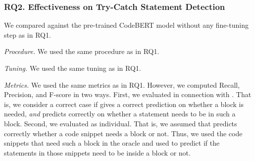 \subsubsection{RQ2. Effectiveness on Try-Catch Statement Detection\\}

 We compared {\xstate} against the pre-trained
CodeBERT model without any fine-tuning step as in RQ1.

{\em Procedure.} We used the same procedure as in RQ1.

{\em Tuning.} We used the same tuning as in RQ1.

{\em Metrics.} We used the same metrics as in RQ1. However, we
computed Recall, Precision, and F-score in two ways. First, we
evaluated {\xstate} in connection with {\xblock}. That is, we consider
a correct case if {\xblock} gives a correct prediction on whether a
 block is needed, {\em and} {\xstate} predicts
correctly on whether a statement needs to be in such a block. Second,
we evaluated {\xstate} as individual. That is, we assumed that
{\xblock} predicts correctly whether a code snippet needs a
 block or not. Thus, we used the code snippets that
need such a block in the oracle and used {\xstate} to predict if the
statements in those snippets need to be inside a 
block or not.




